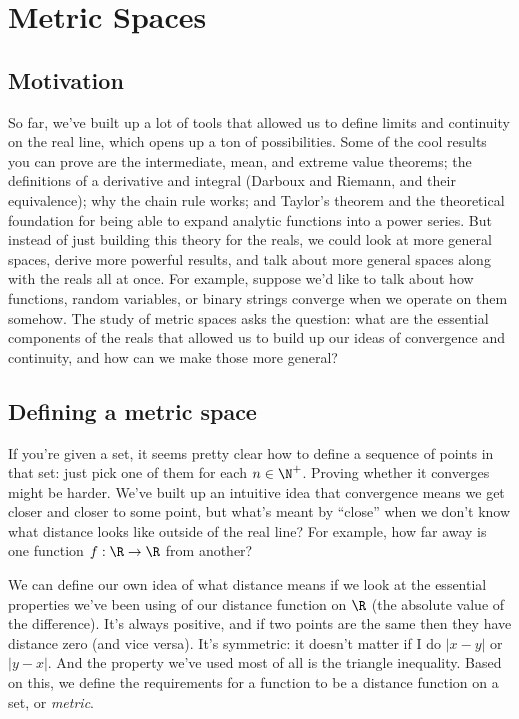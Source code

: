 \documentclass[../analysis.tex]{subfiles}
\begin{document}
    \section{Metric Spaces}
    \subsection{Motivation}

    So far, we've built up a lot of tools that allowed us to define limits and continuity on the real line, which opens up a ton of possibilities. Some of the cool results you can prove are the intermediate, mean, and extreme value theorems; the definitions of a derivative and integral (Darboux and Riemann, and their equivalence); why the chain rule works; and Taylor's theorem and the theoretical foundation for being able to expand analytic functions into a power series. But instead of just building this theory for the reals, we could look at more general spaces, derive more powerful results, and talk about more general spaces along with the reals all at once.
    For example, suppose we'd like to talk about how functions, random variables, or binary strings converge when we operate on them somehow. The study of metric spaces asks the question: what are the essential components of the reals that allowed us to build up our ideas of convergence and continuity, and how can we make those more general?

    \subsection{Defining a metric space}

    If you're given a set, it seems pretty clear how to define a sequence of points in that set: just pick one of them for each $n \in \N^+$. Proving whether it converges might be harder. We've built up an intuitive idea that convergence means we get closer and closer to some point, but what's meant by ``close'' when we don't know what distance looks like outside of the real line? For example, how far away is one function $f: \R \to \R$ from another?

    We can define our own idea of what distance means if we look at the essential properties we've been using of our distance function on $\R$ (the absolute value of the difference). It's always positive, and if two points are the same then they have distance zero (and vice versa). It's symmetric: it doesn't matter if I do $|x - y|$ or $|y - x|$. And the property we've used most of all is the triangle inequality. Based on this, we define the requirements for a function to be a distance function on a set, or \emph{metric}.
\end{document}
